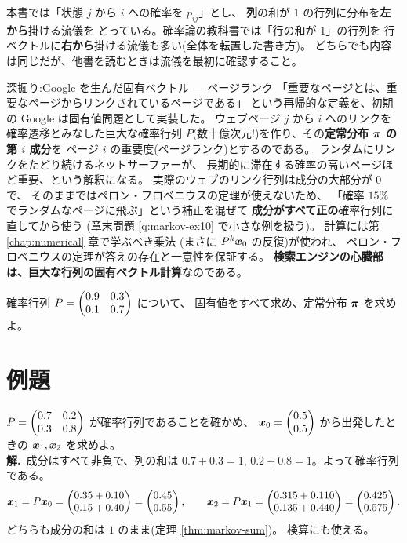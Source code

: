 \begin{chui}
本書では「状態 $j$ から $i$ への確率を $p_{ij}$」とし、
\textbf{列}の和が $1$ の行列に分布を\textbf{左から}掛ける流儀を
とっている。確率論の教科書では「行の和が $1$」の行列を
行ベクトルに\textbf{右から}掛ける流儀も多い(全体を転置した書き方)。
どちらでも内容は同じだが、他書を読むときは流儀を最初に確認すること。
\end{chui}

\begin{itembox}[l]{深掘り:Google を生んだ固有ベクトル ― ページランク}
「重要なページとは、重要なページからリンクされているページである」
という再帰的な定義を、初期の Google は固有値問題として実装した。
ウェブページ $j$ から $i$ へのリンクを確率遷移とみなした巨大な確率行列
$P$(数十億次元!)を作り、その\textbf{定常分布 $\bm{\pi}$ の第 $i$ 成分}を
ページ $i$ の重要度(ページランク)とするのである。
ランダムにリンクをたどり続けるネットサーファーが、
長期的に滞在する確率の高いページほど重要、という解釈になる。
実際のウェブのリンク行列は成分の大部分が $0$ で、
そのままではペロン・フロベニウスの定理が使えないため、
「確率 $15\%$ でランダムなページに飛ぶ」という補正を混ぜて
\textbf{成分がすべて正の}確率行列に直してから使う
(章末問題 \ref{q:markov-ex10} で小さな例を扱う)。
計算には第 \ref{chap:numerical} 章で学ぶべき乗法
(まさに $P^k\bm{x}_0$ の反復)が使われ、
ペロン・フロベニウスの定理が答えの存在と一意性を保証する。
\textbf{検索エンジンの心臓部は、巨大な行列の固有ベクトル計算}なのである。
\end{itembox}

\begin{mondai}\label{q:markov}
確率行列 $P = \begin{pmatrix}0.9 & 0.3 \\ 0.1 & 0.7\end{pmatrix}$ について、
固有値をすべて求め、定常分布 $\bm{\pi}$ を求めよ。
\end{mondai}

\section{例題}

\begin{rei}[例題・基本(分布の時間発展)]\label{rei:markov-basic1}
$P = \begin{pmatrix}0.7 & 0.2 \\ 0.3 & 0.8\end{pmatrix}$ が確率行列であることを確かめ、
$\bm{x}_0 = \begin{pmatrix}0.5 \\ 0.5\end{pmatrix}$ から出発したときの
$\bm{x}_1, \bm{x}_2$ を求めよ。\\
\textbf{解.}\ 成分はすべて非負で、列の和は $0.7 + 0.3 = 1$,
$0.2 + 0.8 = 1$。よって確率行列である。
\[
\bm{x}_1 = P\bm{x}_0
= \begin{pmatrix}0.35 + 0.10 \\ 0.15 + 0.40\end{pmatrix} = \begin{pmatrix}0.45 \\ 0.55\end{pmatrix},
\qquad
\bm{x}_2 = P\bm{x}_1
= \begin{pmatrix}0.315 + 0.110 \\ 0.135 + 0.440\end{pmatrix} = \begin{pmatrix}0.425 \\ 0.575\end{pmatrix}.
\]
どちらも成分の和は $1$ のまま(定理 \ref{thm:markov-sum})。
検算にも使える。
\end{rei}


